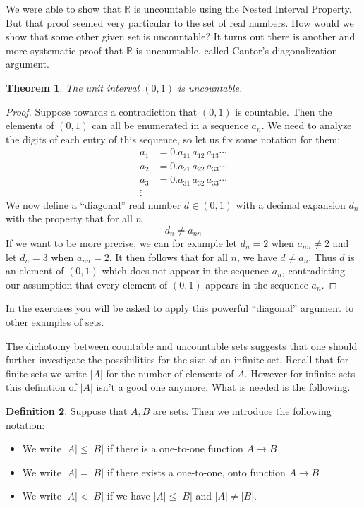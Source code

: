 \documentclass[11pt,oneside]{amsbook}
\newcommand{\R}{\mathbb R}
\theoremstyle{definition}
\theoremstyle{plain}
\newtheorem{thm}{Theorem}[section]
\theoremstyle{definition}
\newtheorem{defn}[thm]{Definition}
\theoremstyle{remark}
\numberwithin{equation}{section}
\numberwithin{figure}{section}
\begin{document}
We were able to show that $\R$ is uncountable using the Nested Interval Property. But that proof seemed very particular to the set of real numbers. How would we show that some other given set is uncountable? It turns out there is another and more systematic proof that $\R$ is uncountable, called Cantor's diagonalization argument.

\begin{thm}
  The unit interval $(0,1)$ is uncountable.
\end{thm}

\begin{proof}
  Suppose towards a contradiction that $(0,1)$ is countable. Then the elements of $(0,1)$ can all be enumerated in a sequence $a_n$. We need to analyze the digits of each entry of this sequence, so let us fix some notation for them:
  \begin{align*}
    a_1&=0.a_{11}\,a_{12}\,a_{13}\cdots\\
    a_2&=0.a_{21}\,a_{22}\,a_{33}\cdots\\
    a_3&=0.a_{31}\,a_{32}\,a_{33}\cdots\\
    \vdots&
  \end{align*}
  We now define a ``diagonal'' real number $d\in(0,1)$ with a decimal expansion $d_n$ with the property that for all $n$
  \[d_n\neq a_{nn}
  \]
  If we want to be more precise, we can for example let $d_n=2$ when $a_{nn}\neq2$ and let $d_n=3$ when $a_{nn}=2$. It then follows that for all $n$, we have $d\neq a_n$. Thus $d$ is an element of $(0,1)$ which does not appear in the sequence $a_n$, contradicting our assumption that every element of $(0,1)$ appears in the sequence $a_n$.
\end{proof}

In the exercises you will be asked to apply this powerful ``diagonal'' argument to other examples of sets.

The dichotomy between countable and uncountable sets suggests that one should further investigate the possibilities for the size of an infinite set. Recall that for finite sets we write $|A|$ for the number of elements of $A$. However for infinite sets this definition of $|A|$ isn't a good one anymore. What is needed is the following.

\begin{defn}
  Suppose that $A,B$ are sets. Then we introduce the following notation:
  \begin{itemize}
  \item We write $|A|\leq|B|$ if there is a one-to-one function $A\to B$
  \item We write $|A|=|B|$ if there exists a one-to-one, onto function $A\to B$
  \item We write $|A|<|B|$ if we have $|A|\leq|B|$ and $|A|\neq|B|$.
  \end{itemize}
\end{defn}
\end{document}
